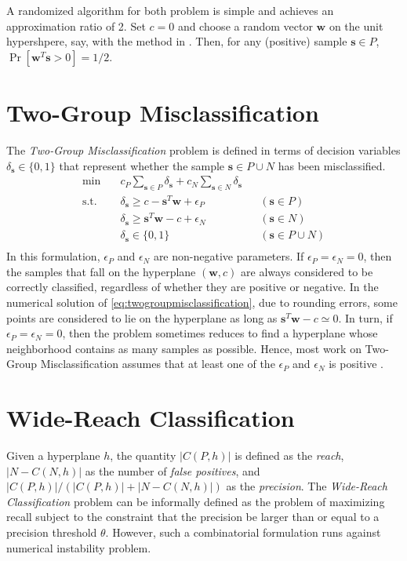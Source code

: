 \documentclass[11pt]{article}
\theoremstyle{definition}
\newcommand{\vect}[1]{\mathbf{#1}}
\newcommand{\sv}[1]{_{\vect{#1}}}
\begin{document}
A randomized algorithm for both problem is simple and achieves an approximation ratio of 2. 
Set $c = 0$ and choose a random vector $\vect{w}$ on the unit hypershpere, say, with the
method in \cite{rndvect}. Then, for any (positive) sample $\vect{s} \in P$,
$\Pr [ \vect{w}^T \vect{s} > 0 ] = 1 / 2$.

\section{Two-Group Misclassification}
The {\em Two-Group Misclassification\/} problem \cite{ClassificationOptSurvey} is defined in terms of decision variables $\delta\sv{s} \in \{ 0, 1 \}$ 
that represent whether the sample $\vect{s} \in P \cup N$ has been misclassified.
\begin{align}
\label{eq:twogroupmisclassification}
\min\quad & 
c_P \sum_{\vect{s} \in P} \delta\sv{s} + c_N \sum_{\vect{s} \in N} \delta\sv{s} \\
\text{s.t.}\quad & 
\delta\sv{s} \geq c - \vect{s}^T \vect{w} + \epsilon_P & & (\vect{s} \in P) \\
& \delta\sv{s} \geq \vect{s}^T \vect{w} - c + \epsilon_N & & (\vect{s} \in N) \\
& \delta\sv{s} \in \{ 0, 1 \} & & (\vect{s} \in P \cup N) \\
\end{align}
In this formulation, $\epsilon_P$ and $\epsilon_N$ are non-negative parameters.
If $\epsilon_P = \epsilon_N = 0$, then the samples that fall on the hyperplane
$(\vect{w}, c)$ are always considered to be correctly classified, regardless
of whether they are positive or negative.
In the numerical solution of \eqref{eq:twogroupmisclassification},
due to rounding errors, some points are considered to lie on the hyperplane
as long as $\vect{s}^T \vect{w} - c \simeq 0$.
In turn, if $\epsilon_P = \epsilon_N = 0$, then
the problem sometimes reduces to find a hyperplane whose neighborhood contains
as many samples as possible. 
Hence, most work on Two-Group Misclassification assumes that at least one of 
the $\epsilon_P$ and $\epsilon_N$ is positive \cite{ClassificationOptSurvey}.


\section{Wide-Reach Classification}
Given a hyperplane $h$, the quantity $|C(P, h)|$ is defined as the {\em reach\/},
$|N - C(N,h)|$ as the number of {\em false positives\/},
and $|C(P,h)| / (|C(P,h)| + |N - C(N,h)|)$ as the {\em precision\/}.
The {\em Wide-Reach Classification\/} problem can be informally defined
as the problem of maximizing recall subject to the constraint that the precision
be larger than or equal to a precision threshold $\theta$.
However, such a combinatorial formulation runs against numerical instability problem. 




\end{document}

